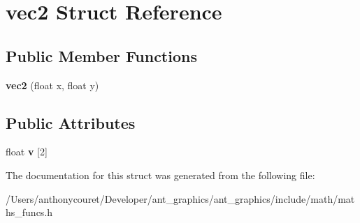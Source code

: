\hypertarget{structvec2}{\section{vec2 Struct Reference}
\label{structvec2}
}
\subsection*{Public Member Functions}
\begin{DoxyCompactItemize}
\item 
\hypertarget{structvec2_a9486933da4d4d819a8b99bae91066cb3}{{\bfseries vec2} (float x, float y)}\label{structvec2_a9486933da4d4d819a8b99bae91066cb3}

\end{DoxyCompactItemize}
\subsection*{Public Attributes}
\begin{DoxyCompactItemize}
\item 
\hypertarget{structvec2_ae25758a321e69cf6f722589fca155735}{float {\bfseries v} \mbox{[}2\mbox{]}}\label{structvec2_ae25758a321e69cf6f722589fca155735}

\end{DoxyCompactItemize}


The documentation for this struct was generated from the following file\+:\begin{DoxyCompactItemize}
\item 
/\+Users/anthonycouret/\+Developer/ant\+\_\+graphics/ant\+\_\+graphics/include/math/maths\+\_\+funcs.\+h\end{DoxyCompactItemize}
